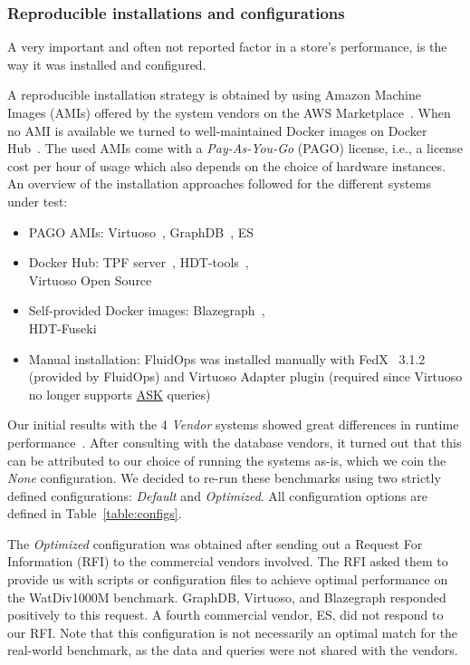 \subsubsection{Reproducible installations and configurations}

A very important and often not reported factor in a store's performance, is the way it was installed and configured. 

A reproducible installation strategy is obtained by using Amazon Machine Images (AMIs) offered by the system vendors on the AWS Marketplace~\cite{awsmarketplace}. When no AMI is available we turned to well-maintained Docker images on Docker Hub~\cite{dockerhub}.
The used AMIs come with a \emph{Pay-As-You-Go} (PAGO) license, i.e., a license cost per hour of usage which also depends on the choice of hardware instances.
An overview of the installation approaches followed for the different systems under test:

\begin{itemize}
	\item PAGO AMIs: Virtuoso~\cite{Virtuoso}, GraphDB~\cite{graphdb}, ES
	\item Docker Hub: TPF server~\cite{dockerhubldfserver}, HDT-tools~\cite{hdtcpp}, \\ Virtuoso Open Source~\cite{virtuosoos} 
	\item Self-provided Docker images: Blazegraph~\cite{dockerblazegraph}, \\ HDT-Fuseki~\cite{hdtfuseki} 
	\item Manual installation: FluidOps was installed manually with FedX~\cite{saleem2016fine} 3.1.2 (provided by \mbox{FluidOps}) and Virtuoso Adapter plugin (required since \mbox{Virtuoso} no longer supports \url{ASK} queries)
\end{itemize}

Our initial results with the 4 \emph{Vendor} systems showed great differences in runtime performance~\cite{de2016big}. After consulting with the database vendors, it turned out that this can be attributed to our choice of running the systems as-is, which we coin the \emph{None} configuration. We decided to re-run these benchmarks using two strictly defined configurations: \emph{Default} and \emph{Optimized}. All configuration options are defined in Table~\ref{table:configs}. 

The \emph{Optimized} configuration was obtained after sending out a  Request For Information (RFI) to the commercial vendors involved. The RFI asked them to provide us with scripts or configuration files to achieve optimal performance on the WatDiv1000M benchmark. GraphDB, Virtuoso, and Blazegraph responded positively to this request. A fourth commercial vendor, ES, did not respond to our RFI. Note that this configuration is not necessarily an optimal match for the real-world benchmark, as the data and queries were not shared with the vendors.

